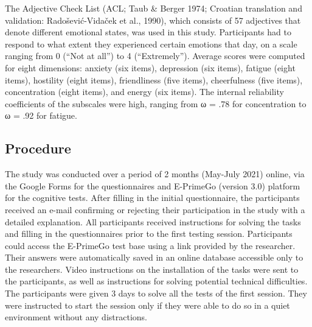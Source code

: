\documentclass[authordate, empirical]{jote-new-article}
\begin{document}
The Adjective Check List (ACL; Taub \& Berger 1974; Croatian translation and validation: Radošević-Vidaček et al., 1990), which consists of 57 adjectives that denote different emotional states, was used in this study. Participants had to respond to what extent they experienced certain emotions that day, on a scale ranging from 0 (“Not at all”) to 4 (“Extremely”). Average scores were computed for eight dimensions: anxiety (six items), depression (six items), fatigue (eight items), hostility (eight items), friendliness (five items), cheerfulness (five items), concentration (eight items), and energy (six items). The internal reliability coefficients of the subscales were high, ranging from ω = .78 for concentration to ω = .92 for fatigue.



\subsection{Procedure }



The study was conducted over a period of 2 months (May-July 2021) online, via the Google Forms for the questionnaires and E-PrimeGo (version 3.0) platform for the cognitive tests. After filling in the initial questionnaire, the participants received an e-mail confirming or rejecting their participation in the study with a detailed explanation. All participants received instructions for solving the tasks and filling in the questionnaires prior to the first testing session. Participants could access the E-PrimeGo test base using a link provided by the researcher. Their answers were automatically saved in an online database accessible only to the researchers. Video instructions on the installation of the tasks were sent to the participants, as well as instructions for solving potential technical difficulties. The participants were given 3 days to solve all the tests of the first session. They were instructed to start the session only if they were able to do so in a quiet environment without any distractions.
\end{document}
